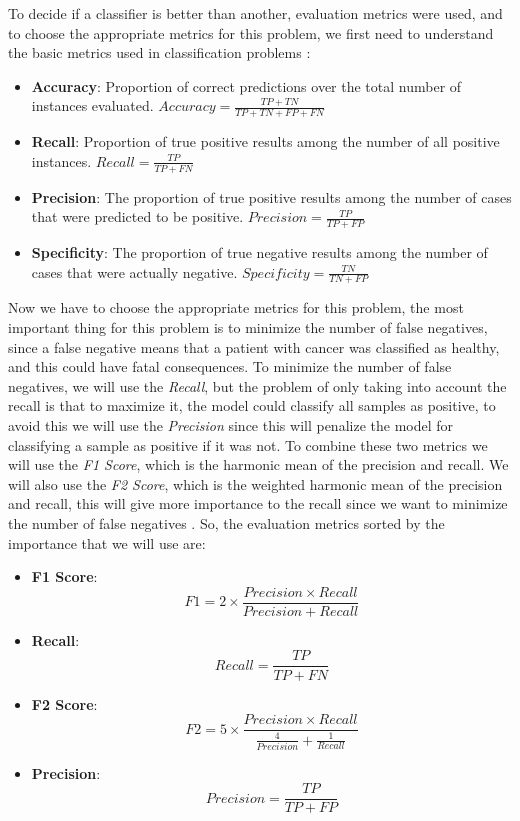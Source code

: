 To decide if a classifier is better than another, evaluation metrics were used, and to choose the appropriate metrics for this problem, we first need to understand the basic metrics used in classification problems \cite{m_review_2015}:

\begin{itemize}
    \item \textbf{Accuracy}: Proportion of correct predictions over the total number of instances evaluated. $Accuracy = \frac{TP + TN}{TP + TN + FP + FN}$
    \item \textbf{Recall}: Proportion of true positive results among the number of all positive instances. $Recall = \frac{TP}{TP + FN}$
    \item \textbf{Precision}: The proportion of true positive results among the number of cases that were predicted to be positive. $Precision = \frac{TP}{TP + FP}$
    \item \textbf{Specificity}: The proportion of true negative results among the number of cases that were actually negative. $Specificity = \frac{TN}{TN + FP}$
\end{itemize}

Now we have to choose the appropriate metrics for this problem, the most important thing for this problem is to minimize the number of false negatives, since a false negative means that a patient with cancer was classified as healthy, and this could have fatal consequences. To minimize the number of false negatives, we will use the \textit{Recall}, but the problem of only taking into account the recall is that to maximize it, the model could classify all samples as positive, to avoid this we will use the \textit{Precision} since this will penalize the model for classifying a sample as positive if it was not. To combine these two metrics we will use the \textit{F1 Score}, which is the harmonic mean of the precision and recall. We will also use the \textit{F2 Score}, which is the weighted harmonic mean of the precision and recall, this will give more importance to the recall since we want to minimize the number of false negatives \cite{rutecki_best_nodate}. So, the evaluation metrics sorted by the importance that we will use are:

\begin{itemize}
    \item \textbf{F1 Score}: $$F1 = 2 \times \frac{Precision \times Recall}{Precision + Recall}$$
    \item \textbf{Recall}: $$Recall = \frac{TP}{TP + FN}$$
    \item \textbf{F2 Score}: $$F2 = 5 \times \frac{Precision \times Recall}{\frac{4}{Precision} + \frac{1}{Recall}}$$
    \item \textbf{Precision}: $$Precision = \frac{TP}{TP + FP}$$
\end{itemize}

